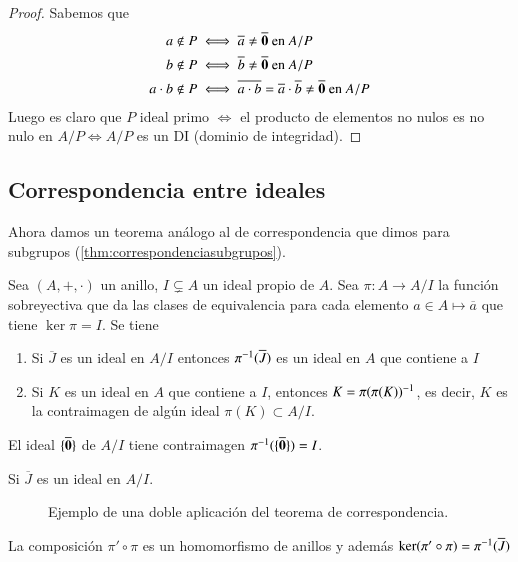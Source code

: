 \begin{proof}
	Sabemos que
	\begin{align*}
		a \notin P &\iff \overline{a} \neq \overline{\mathbf{0}} \text{ en } A/P \\
		b \notin P &\iff \overline{b} \neq \overline{\mathbf{0}} \text{ en } A/P \\
		a\cdot b \notin P &\iff \overline{a\cdot b} = \overline{a}\cdot \overline{b} \neq \overline{\mathbf{0}} \text{ en } A/P
	\end{align*}
	Luego es claro que $P$ ideal primo $\iff$ el producto de elementos no nulos es no nulo en $A/P \iff A/P$ es un DI (dominio de integridad).
\end{proof}

\subsection{Correspondencia entre ideales}

Ahora damos un teorema análogo al de correspondencia que dimos para subgrupos (\autoref{thm:correspondenciasubgrupos}).

\begin{thm}
	Sea $(A, +, \cdot)$ un anillo, $I \subsetneq A$ un ideal propio de $A$. Sea $\pi: A \to A/I$ la función sobreyectiva que da las clases de equivalencia para cada elemento $a \in A \mapsto \overline{a}$ que tiene $\ker \pi = I$. Se tiene
	\begin{enumerate}
		\item Si $\overline{J}$ es un ideal en $A/I$ entonces $\pi^{-1}(\overline{J})$ es un ideal en $A$ que contiene a $I$
		\item Si $K$ es un ideal en $A$ que contiene a $I$, entonces $K = \pi(\pi(K))^{-1}$, es decir, $K$ es la contraimagen de algún ideal $\pi(K) \subset A/I$.
	\end{enumerate}
\end{thm}

\begin{obs}
	El ideal $\{\overline{\mathbf{0}}\}$ de $A/I$ tiene contraimagen $\pi^{-1}(\{\overline{\mathbf{0}}\}) = I$.
\end{obs}

\begin{obs}
	Si $\overline{J}$ es un ideal en $A/I$.
	
	\begin{figure}[h]
		\centering
		\caption{Ejemplo de una doble aplicación del teorema de correspondencia.}
	\end{figure}
	La composición $\pi' \circ \pi$ es un homomorfismo de anillos y además $\ker (\pi' \circ \pi) = \pi^{-1}(\overline{J})$
\end{obs}

